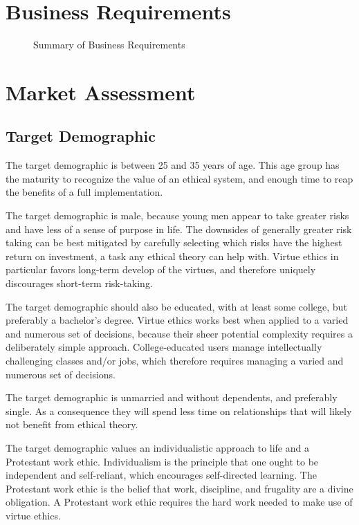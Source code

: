 \documentclass{article}
\begin{document}
\section{Business Requirements}

\begin{landscape}
    \begin{figure}
    \centering
    \def\svgwidth{\columnwidth}
    
    \label{fig:business}
    \caption{Summary of Business Requirements}
    \end{figure}
\end{landscape}

\section{Market Assessment}

\subsection{Target Demographic}

The target demographic is between 25 and 35 years of age.
This age group has the maturity to recognize the value of an ethical system, and enough time to reap the benefits of a full implementation.

The target demographic is male, because young men appear to take greater risks and have less of a sense of purpose in life.
The downsides of generally greater risk taking can be best mitigated by carefully selecting which risks have the highest return on investment, a task any ethical theory can help with.
Virtue ethics in particular favors long-term develop of the virtues, and therefore uniquely discourages short-term risk-taking.

The target demographic should also be educated, with at least some college, but preferably a bachelor's degree.
Virtue ethics works best when applied to a varied and numerous set of decisions, because their sheer potential complexity requires a deliberately simple approach.
College-educated users manage intellectually challenging classes and/or jobs, which therefore requires managing a varied and numerous set of decisions.

The target demographic is unmarried and without dependents, and preferably single.
As a consequence they will spend less time on relationships that will likely not benefit from ethical theory.

The target demographic values an individualistic approach to life and a Protestant work ethic.
Individualism is the principle that one ought to be independent and self-reliant, which encourages self-directed learning.
The Protestant work ethic is the belief that work, discipline, and frugality are a divine obligation.
A Protestant work ethic requires the hard work needed to make use of virtue ethics.
\end{document}

